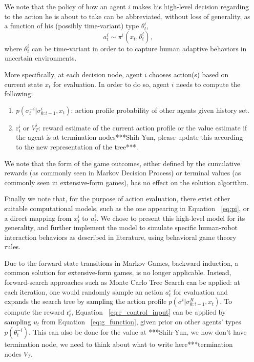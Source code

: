 \documentclass[letterpaper, 10 pt, conference]{ieeeconf}  %
\begin{document}
We note that the policy of how an agent $i$ makes his high-level decision regarding to the action he is about to take can be abbreviated, without loss of generality, as a function of his (possibly time-variant) type $\theta^i_t$,
\begin{equation}~\label{eq:pi}
a^i_t \sim \pi^i(x_t,\theta^i_t),
\end{equation}
where $\theta^i_t$ can be time-variant in order to to capture human adaptive behaviors in uncertain environments.  

More specifically, at each decision node, agent $i$ chooses action(s) based on 
current state $x_t$ for evaluation. In order to do so, agent $i$ needs to 
compute the following:
\begin{enumerate}
  \item $p(\sigma^{-i}_t|\sigma^i_{0:t-1},x_t)$: action profile probability of other 
    agents given history set.
  \item r$^i_t$ or $V^i_T$: reward estimate of the current action profile or the value estimate if the agent is at termination nodes***Shih-Yun, please update this according to the new representation of the tree***.
\end{enumerate}
We note that the form of the game outcomes, either defined by the cumulative 
rewards (as commonly seen in Markov Decision Process) or terminal values (as 
commonly seen in extensive-form games), has no effect on the solution algorithm. 

Finally we note that, for the purpose of action evaluation, there exist other suitable computational models, such as the one appearing in Equation ~\ref{eq:pi}, or a direct mapping from $x^i_t$ to $u^i_t$. We chose to present this high-level model for its generality, and further implement the model to simulate specific human-robot interaction behaviors as described in literature, using behavioral game theory rules.  

Due to the forward state transitions in Markov Games, backward induction, a common solution for extensive-form games, is no longer applicable. Instead, forward-search approaches such as Monte Carlo Tree Search can be applied: at each iteration, one would randomly sample an action $a^i_t$ for evaluation and expands the search 
tree by sampling the action profile $p(\sigma^t|\sigma^R_{0:t-1},x_t)$. To compute the reward r$^i_t$, Equation ~\ref{eq:r_control_input} can be applied by sampling $u_t$ from Equation ~\ref{eq:g_function}, given prior on other agents' types $p(\theta^{-i}_t)$. This can also be done for the value at ***Shih-Yun, we now don't have termination node, we need to think about what to write here***termination nodes $V_T$.
\end{document}

